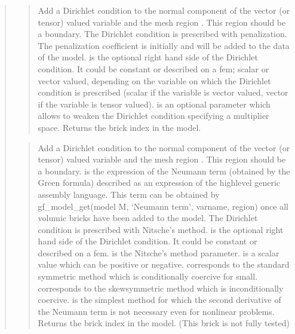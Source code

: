 \documentclass[a4paper,11pt,english]{sphinxmanual}
\begin{document}
\begin{quote}
\begin{quote}

Add a Dirichlet condition to the normal component of the vector
(or tensor) valued variable  and the mesh
region . This region should be a boundary. The Dirichlet
condition is prescribed with penalization. The penalization coefficient
is initially  and will be added to the data of the model.
 is the optional right hand side of the Dirichlet condition.
It could be constant or described on a fem; scalar or vector valued,
depending on the variable on which the Dirichlet condition is prescribed
(scalar if the variable
is vector valued, vector if the variable is tensor valued).
 is an optional parameter which allows to weaken the
Dirichlet condition specifying a multiplier space.
Returns the brick index in the model.
\end{quote}

\begin{quote}

Add a Dirichlet condition to the normal component of the vector
(or tensor) valued variable  and the mesh region .
This region should be a boundary. 
is the expression of the Neumann term (obtained by the Green formula)
described as an expression of the high\sphinxhyphen{}level
generic assembly language. This term can be obtained by
gf\_model\_get(model M, ‘Neumann term’, varname, region) once all volumic bricks have
been added to the model. The Dirichlet
condition is prescribed with Nitsche’s method.  is the optional
right hand side of the Dirichlet condition. It could be constant or
described on a fem.  is the
Nitsche’s method parameter.  is a scalar value which can be
positive or negative.  corresponds to the standard symmetric
method which is conditionally coercive for   small.
 corresponds to the skew\sphinxhyphen{}symmetric method which is
inconditionally coercive.  is the simplest method
for which the second derivative of the Neumann term is not necessary
even for nonlinear problems.
Returns the brick index in the model.
(This brick is not fully tested)
\end{quote}


\end{quote}
\end{document}
